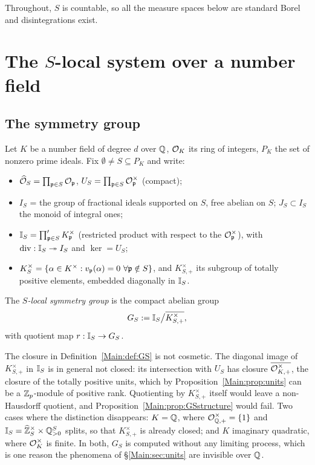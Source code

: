 Throughout, $S$ is countable, so all the measure spaces below are standard
Borel and disintegrations exist.

\section{The $S$-local system over a number field}\label{Main:sec:system}

\subsection{The symmetry group}

Let $K$ be a number field of degree $d$ over $\mathbb{Q}$, $\mathcal{O}_K$ its ring of integers,
$P_K$ the set of nonzero prime ideals. Fix $\emptyset\neq S\subseteq P_K$ and
write:
\begin{itemize}
\item $\widehat{\mathcal{O}}_S=\prod_{\mathfrak{p}\in S}\mathcal{O}_{\mathfrak{p}}$, $U_S=\prod_{\mathfrak{p}\in S}\mathcal{O}_{\mathfrak{p}}^\times$
(compact);
\item $I_S$ = the group of fractional ideals supported on $S$, free abelian on
$S$; $J_S\subset I_S$ the monoid of integral ones;
\item $\mathbb{I}_S=\prod'_{\mathfrak{p}\in S}K_{\mathfrak{p}}^\times$ (restricted product with respect
to the $\mathcal{O}_{\mathfrak{p}}^\times$), with $\operatorname{div}:\mathbb{I}_S\twoheadrightarrow I_S$
and $\ker=U_S$;
\item $K^\times_S=\{\alpha\in K^\times: v_{\mathfrak{p}}(\alpha)=0\ \forall\mathfrak{p}\notin S\}$,
and $K^\times_{S,+}$ its subgroup of totally positive elements, embedded
diagonally in $\mathbb{I}_S$.
\end{itemize}

\begin{definition}\label{Main:def:GS}
The \emph{$S$-local symmetry group} is the compact abelian group
\[
G_S:=\mathbb{I}_S\big/\overline{K^\times_{S,+}},
\]
with quotient map $r:\mathbb{I}_S\to G_S$.
\end{definition}

\begin{remark}\label{Main:rem:closure}
The closure in Definition~\ref{Main:def:GS} is not cosmetic. The diagonal image of
$K^\times_{S,+}$ in $\mathbb{I}_S$ is in general not closed: its intersection with $U_S$ has
closure $\overline{\mathcal{O}^\times_{K,+}}$, the closure of the totally positive units, which by
Proposition~\ref{Main:prop:units} can be a $\mathbb{Z}_p$-module of positive rank. Quotienting by
$K^\times_{S,+}$ itself would leave a non-Hausdorff quotient, and Proposition~\ref{Main:prop:GSstructure}
would fail. Two cases where the distinction disappears: $K=\mathbb{Q}$, where
$\mathcal{O}^\times_{\mathbb{Q},+}=\{1\}$ and $\mathbb{I}_S=\widehat{\mathbb{Z}}_S^\times\times\mathbb{Q}^S_{>0}$ splits, so that
$K^\times_{S,+}$ is already closed; and $K$ imaginary quadratic, where $\mathcal{O}_K^\times$ is
finite. In both, $G_S$ is computed without any limiting process, which is one reason the
phenomena of \S\ref{Main:sec:units} are invisible over $\mathbb{Q}$.
\end{remark}

